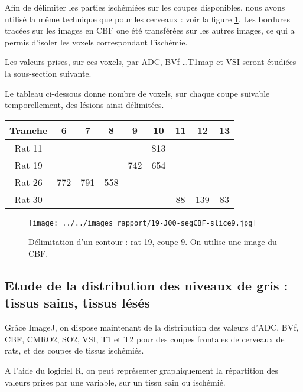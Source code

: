 \etoile
Afin de d\'elimiter les parties isch\'emi\'ees sur les coupes disponibles, nous avons utilis\'e la m\^eme technique que pour les cerveaux : voir la figure \ref{cbf_seg_19}. %
Les bordures trac\'ees sur les images en CBF one \'et\'e transf\'er\'ees sur les autres images, ce qui a permis d'isoler les voxels correspondant  l'isch\'emie.

\par
Les valeurs prises, sur ces voxels, par ADC, BVf \dots T1map et VSI seront \'etudi\'ees  la sous-section suivante.

\par
Le tableau ci-dessous donne nombre de voxels, sur chaque coupe suivable temporellement, des l\'esions ainsi d\'elimit\'ees.

\begin{multicols}{2}
\begin{tabular}{|c|c|c|c|c|c|c|c|c|}
\hline
\small{Tranche}&6&7&8&9&10&11&12&13
\\
\hline
Rat 11&&&&&813&&&
\\
\hline
Rat 19&&&&742&654&&&
\\
\hline
Rat 26&772&791&558&&&&&
\\
\hline
Rat 30&&&&&&88&139&83
\\
\hline
\end{tabular}

\columnbreak
\begin{figure}[H]
\begin{center}
\texttt{[image: ../../images\_rapport/19-J00-segCBF-slice9.jpg]}
\end{center}
\caption{D\'elimitation d'un contour : rat 19, coupe 9. On utilise une image du CBF.}
\label{cbf_seg_19}
\end{figure}
\end{multicols}

\newpage
\FloatBarrier
\subsection{Etude de la distribution des niveaux de gris : tissus sains, tissus l\'es\'es}%

Gr\^ace  ImageJ, on dispose maintenant de la distribution des valeurs d'ADC, BVf, CBF, CMRO2, SO2, VSI, T1 et T2 pour des coupes frontales de cerveaux de rats, %
et des coupes de tissus isch\'emi\'es.

\par
A l'aide du logiciel R, on peut repr\'esenter graphiquement la r\'epartition des valeurs prises par une variable, %
sur un tissu sain ou isch\'emi\'e.

